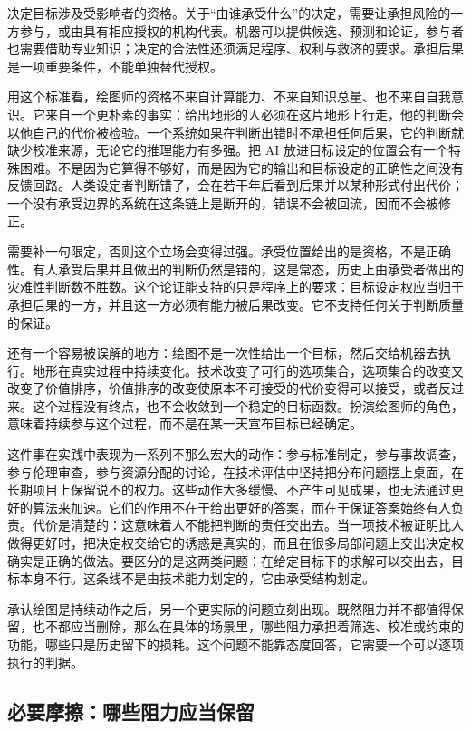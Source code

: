 
决定目标涉及受影响者的资格。关于“由谁承受什么”的决定，需要让承担风险的一方参与，或由具有相应授权的机构代表。机器可以提供候选、预测和论证，参与者也需要借助专业知识；决定的合法性还须满足程序、权利与救济的要求。承担后果是一项重要条件，不能单独替代授权。

用这个标准看，绘图师的资格不来自计算能力、不来自知识总量、也不来自自我意识。它来自一个更朴素的事实：给出地形的人必须在这片地形上行走，他的判断会以他自己的代价被检验。一个系统如果在判断出错时不承担任何后果，它的判断就缺少校准来源，无论它的推理能力有多强。把 AI 放进目标设定的位置会有一个特殊困难。不是因为它算得不够好，而是因为它的输出和目标设定的正确性之间没有反馈回路。人类设定者判断错了，会在若干年后看到后果并以某种形式付出代价；一个没有承受边界的系统在这条链上是断开的，错误不会被回流，因而不会被修正。

需要补一句限定，否则这个立场会变得过强。承受位置给出的是资格，不是正确性。有人承受后果并且做出的判断仍然是错的，这是常态，历史上由承受者做出的灾难性判断数不胜数。这个论证能支持的只是程序上的要求：目标设定权应当归于承担后果的一方，并且这一方必须有能力被后果改变。它不支持任何关于判断质量的保证。


还有一个容易被误解的地方：绘图不是一次性给出一个目标，然后交给机器去执行。地形在真实过程中持续变化。技术改变了可行的选项集合，选项集合的改变又改变了价值排序，价值排序的改变使原本不可接受的代价变得可以接受，或者反过来。这个过程没有终点，也不会收敛到一个稳定的目标函数。扮演绘图师的角色，意味着持续参与这个过程，而不是在某一天宣布目标已经确定。

这件事在实践中表现为一系列不那么宏大的动作：参与标准制定，参与事故调查，参与伦理审查，参与资源分配的讨论，在技术评估中坚持把分布问题摆上桌面，在长期项目上保留说不的权力。这些动作大多缓慢、不产生可见成果，也无法通过更好的算法来加速。它们的作用不在于给出更好的答案，而在于保证答案始终有人负责。代价是清楚的：这意味着人不能把判断的责任交出去。当一项技术被证明比人做得更好时，把决定权交给它的诱惑是真实的，而且在很多局部问题上交出决定权确实是正确的做法。要区分的是这两类问题：在给定目标下的求解可以交出去，目标本身不行。这条线不是由技术能力划定的，它由承受结构划定。

承认绘图是持续动作之后，另一个更实际的问题立刻出现。既然阻力并不都值得保留，也不都应当删除，那么在具体的场景里，哪些阻力承担着筛选、校准或约束的功能，哪些只是历史留下的损耗。这个问题不能靠态度回答，它需要一个可以逐项执行的判据。

\subsection{必要摩擦：哪些阻力应当保留}


